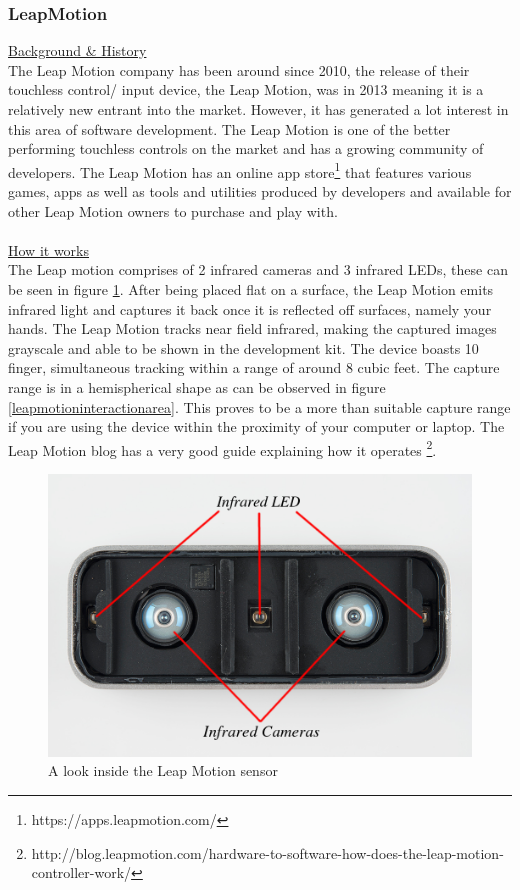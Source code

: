 \documentclass[11pt]{report}
\begin{document}
\subsubsection*{LeapMotion}
\underline{Background \& History} \\ 
The Leap Motion company has been around since 2010, the release of their 
touchless control/ input device, the Leap Motion, was in 2013 meaning it
is a relatively new entrant into the market. However, it has generated a 
lot interest in this area of software development. The Leap Motion is one 
of the better performing touchless controls on the market and has a 
growing community of developers. The Leap Motion has an online app 
store\footnote{https://apps.leapmotion.com/} that features various games, 
apps as well as tools and utilities produced by developers and available 
for other Leap Motion owners to purchase and play with.
\\ \\
\underline{How it works} \\ 
The Leap motion comprises of 2 infrared cameras and 3 infrared LEDs,
these can be seen in figure \ref{leapmotioninteral}. After being 
placed flat on a surface, the Leap Motion emits infrared light and 
captures it back once it is reflected off surfaces, namely your hands.
The Leap Motion tracks near field infrared, making the captured images 
grayscale and able to be shown in the development kit.
The device boasts 10 finger, simultaneous tracking within a range
of around 8 cubic feet. The capture range is in a hemispherical shape
as can be observed in figure \ref{leapmotioninteractionarea}. This 
proves to be a more than suitable capture range if you are using the
device within the proximity of your computer or laptop. The Leap Motion
blog has a very good guide explaining how it operates 
\footnote{http://blog.leapmotion.com/hardware-to-software-how-does-the-leap-motion-controller-work/}.

\begin{center}
	\begin{figure}[H]
		\begin{center}
			\includegraphics[scale=0.8]{pics/leapmotioninternal}
			\caption{A look inside the Leap Motion sensor}
			\label{leapmotioninteral}
		\end{center}
	\end{figure}
\end{center}
\end{document}
